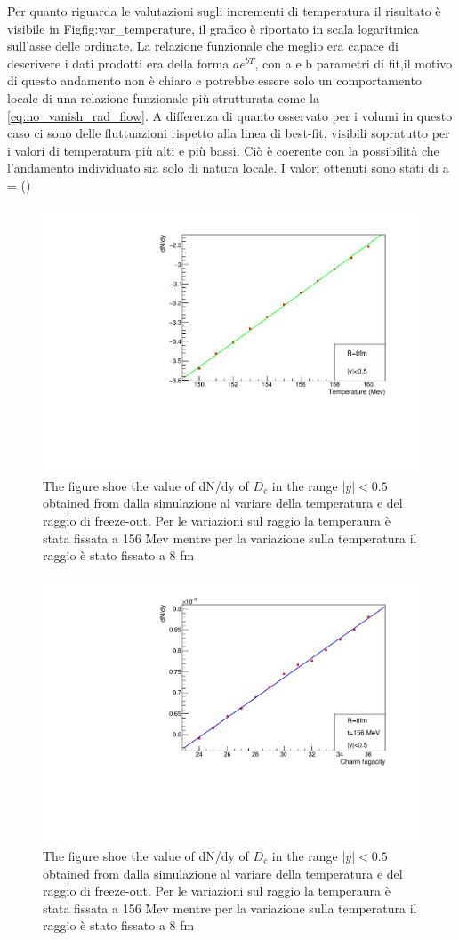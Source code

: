 \documentclass[12pt,a4paper]{book}
\begin{document}
	Per quanto riguarda le valutazioni sugli incrementi di temperatura il risultato è visibile in Fig{fig:var_temperature}, il grafico è riportato in scala logaritmica sull'asse delle ordinate. La relazione funzionale che meglio era capace di descrivere i dati prodotti era della forma $a e^{bT}$, con a e b parametri di fit,il motivo di questo andamento non è chiaro e potrebbe essere solo un comportamento locale di una relazione funzionale più strutturata come la \ref{eq:no_vanish_rad_flow}. A differenza di quanto osservato per i volumi in questo caso ci sono delle fluttuazioni rispetto alla linea di best-fit, visibili sopratutto per i valori di temperatura più alti e più bassi. Ciò è coerente con la possibilità che l'andamento individuato sia solo di natura locale. I valori ottenuti sono stati di a = ()
		\begin{figure}
		\includegraphics[width=0.8 \linewidth]{pictures/var_temperaure.pdf}
		\caption{The figure shoe the value of dN/dy of $D_c$ in the range $|y|<0.5$ obtained from dalla simulazione al variare della temperatura e del raggio di freeze-out. Per le variazioni sul raggio la temperaura è stata fissata a 156 Mev mentre per la variazione sulla temperatura il raggio è stato fissato a 8 fm}
		\label{fig:var_temperaure}
	\end{figure}
		\begin{figure}
		\includegraphics[width=0.8 \linewidth]{pictures/var_fugacity.pdf}
		\caption{The figure shoe the value of dN/dy of $D_c$ in the range $|y|<0.5$ obtained from dalla simulazione al variare della temperatura e del raggio di freeze-out. Per le variazioni sul raggio la temperaura è stata fissata a 156 Mev mentre per la variazione sulla temperatura il raggio è stato fissato a 8 fm}
		\label{fig:var_fugacity}
	\end{figure}
	
\end{document}
